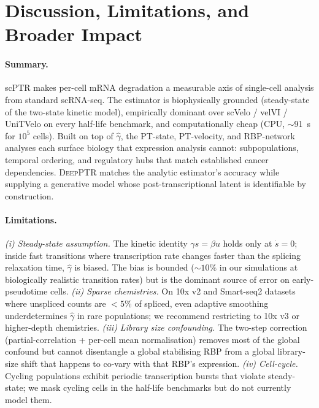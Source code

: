 \documentclass{article}
\begin{document}
\section{Discussion, Limitations, and Broader Impact}
\label{sec:discussion}

\paragraph{Summary.} scPTR makes per-cell mRNA degradation a measurable
axis of single-cell analysis from standard scRNA-seq. The estimator is
biophysically grounded (steady-state of the two-state kinetic model),
empirically dominant over scVelo / velVI / UniTVelo on every half-life
benchmark, and computationally cheap (CPU, $\sim$91~s for $10^5$ cells).
Built on top of $\widehat\gamma$, the PT-state, PT-velocity, and
RBP-network analyses each surface biology that expression analysis
cannot: subpopulations, temporal ordering, and regulatory hubs that match
established cancer dependencies. \textsc{DeepPTR} matches the analytic
estimator's accuracy while supplying a generative model whose
post-transcriptional latent is identifiable by construction.

\paragraph{Limitations.} \emph{(i) Steady-state assumption.} The kinetic
identity $\gamma s = \beta u$ holds only at $\dot s {=} 0$; inside fast
transitions where transcription rate changes faster than the splicing
relaxation time, $\widehat\gamma$ is biased. The bias is bounded
($\sim 10\%$ in our simulations at biologically realistic transition
rates) but is the dominant source of error on early-pseudotime cells.
\emph{(ii) Sparse chemistries.} On 10x v2 and Smart-seq2 datasets where
unspliced counts are $<5\%$ of spliced, even adaptive smoothing
underdetermines $\widehat\gamma$ in rare populations; we recommend
restricting to 10x v3 or higher-depth chemistries. \emph{(iii) Library
size confounding.} The two-step correction (partial-correlation +
per-cell mean normalisation) removes most of the global confound but
cannot disentangle a global stabilising RBP from a global library-size
shift that happens to co-vary with that RBP's expression. \emph{(iv)
Cell-cycle.} Cycling populations exhibit periodic transcription bursts
that violate steady-state; we mask cycling cells in the half-life
benchmarks but do not currently model them.
\end{document}
